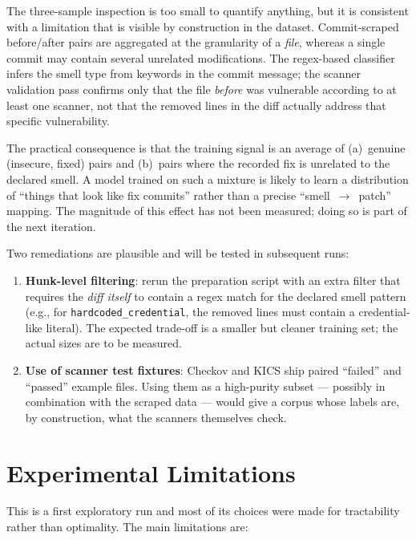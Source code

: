\documentclass[12pt, a4paper]{report}
\begin{document}
The three-sample inspection is too small to quantify anything, but it
is consistent with a limitation that is visible by construction in the
dataset. Commit-scraped before/after pairs are aggregated at the
granularity of a \emph{file}, whereas a single commit may contain
several unrelated modifications. The regex-based classifier infers the
smell type from keywords in the commit message; the scanner validation
pass confirms only that the file \emph{before} was vulnerable according
to at least one scanner, not that the removed lines in the diff actually
address that specific vulnerability.

The practical consequence is that the training signal is an average of
(a)~genuine (insecure, fixed) pairs and (b)~pairs where the recorded
fix is unrelated to the declared smell. A model trained on such a
mixture is likely to learn a distribution of ``things that look like
fix commits'' rather than a precise ``smell~$\to$~patch'' mapping.
The magnitude of this effect has not been measured; doing so is part of
the next iteration.

Two remediations are plausible and will be tested in subsequent runs:

\begin{enumerate}
  \item \textbf{Hunk-level filtering}: rerun the preparation script with
        an extra filter that requires the \emph{diff itself} to contain
        a regex match for the declared smell pattern (e.g., for
        \texttt{hardcoded\_credential}, the removed lines must contain
        a credential-like literal). The expected trade-off is a smaller
        but cleaner training set; the actual sizes are to be measured.
  \item \textbf{Use of scanner test fixtures}: Checkov and KICS ship
        paired ``failed'' and ``passed'' example files. Using them as a
        high-purity subset --- possibly in combination with the scraped
        data --- would give a corpus whose labels are, by construction,
        what the scanners themselves check.
\end{enumerate}

\section{Experimental Limitations}

This is a first exploratory run and most of its choices were made for
tractability rather than optimality. The main limitations are:
\end{document}
